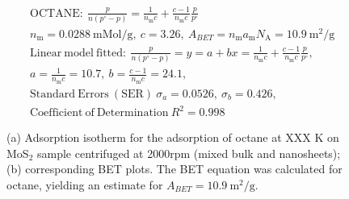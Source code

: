 

\begin{align*}
&\mathrm{OCTANE:}\ \frac{p}{n(p^\circ-p)}=\frac{1}{n_\mathrm{m}c}+\frac{c-1}{n_\mathrm{m}c}\frac{p}{p^\circ}\\
&{n_\mathrm{m}}=0.0288\ \mathrm{mMol/g},\ c=3.26,\ A_{BET}={n_\mathrm{m}}{a_\mathrm{m}}{N_\mathrm{A}}=10.9\ \mathrm{m}^2\mathrm{/g}\\
&\mathrm{Linear\ model\ fitted:}\ \frac{p}{n(p^\circ-p)}=y=a+bx=\frac{1}{n_\mathrm{m}c}+\frac{c-1}{n_\mathrm{m}c}\frac{p}{p^\circ},\\
&a=\frac{1}{n_\mathrm{m}c}=10.7,\ b=\frac{c-1}{n_\mathrm{m}c}=24.1,\\
&\mathrm{Standard\ Errors\ (SER)}\ \sigma_a=0.0526,\ \sigma_b=0.426,\\
&\mathrm{Coefficient\ of\ Determination}\ R^2 = 0.998
\end{align*}


\begin{figure}[htb]
\hfill
{}
\caption{(a) Adsorption isotherm for the adsorption of octane at XXX K on MoS$_2$ 
sample centrifuged at 2000rpm (mixed bulk and nanosheets);
(b) corresponding BET plots. The BET equation was calculated for octane, yielding an estimate for $A_{BET}=10.9\ \mathrm{m}^2\mathrm{/g}$.}

\label{fig:sa-Reference-As-Supplied-5mg-3mm-30C-S2-SA-10ml}
\end{figure}


